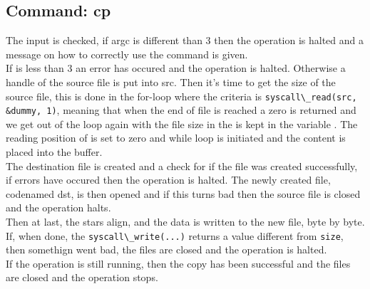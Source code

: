 \subsection{Command: cp}
The input is checked, if argc is different than 3 then the operation is halted
and a message on how to correctly use the command is given.\\
If  is less than 3 an error has occured and the
operation is halted. Otherwise a handle of the source file is put into src. Then
it's time to get the size of the source file, this is done in the for-loop where
the criteria is \verb|syscall\_read(src, &dummy, 1)|, meaning that when the end
of file is reached a zero is returned and we get out of the loop again with the
file size in the is kept in the variable . The reading position of
 is set to zero and while loop is initiated and the content is placed
into the buffer.\\
The destination file is created and a check for if the file was created
successfully, if errors have occured then the operation is halted.
The newly created file, codenamed dst, is then opened and if this turns bad then
the source file is closed and the operation halts.\\
Then at last, the stars align, and the data is written to the new file, byte by
byte. If, when done, the \verb|syscall\_write(...)| returns a value different
from \verb|size|, then somethign went bad, the files are closed and the
operation is halted.\\
If the operation is still running, then the copy has been successful and the
files are closed and the operation stops.

